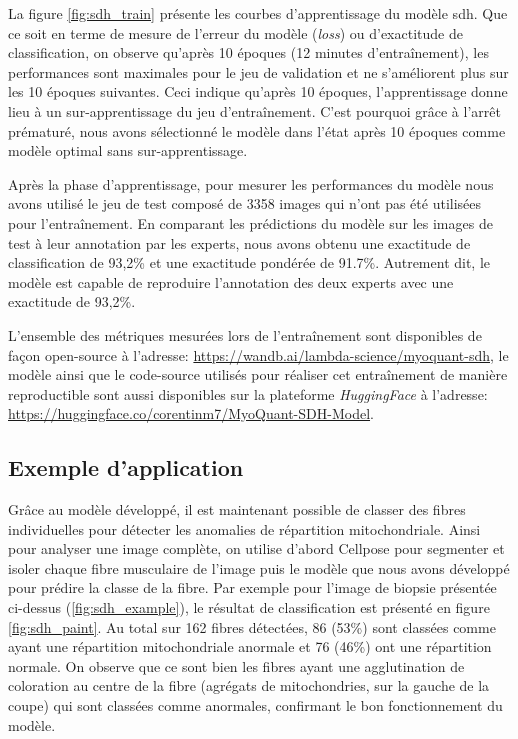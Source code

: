 La figure \ref{fig:sdh_train} présente les courbes d'apprentissage du modèle \gls{sdh}. Que ce soit en terme de mesure de l'erreur du modèle (\textit{loss}) ou d'exactitude de classification, on observe qu'après 10 époques (12 minutes d'entraînement), les performances sont maximales pour le jeu de validation et ne s'améliorent plus sur les 10 époques suivantes. Ceci indique qu'après 10 époques, l'apprentissage donne lieu à un sur-apprentissage du jeu d'entraînement. C'est pourquoi grâce à l'arrêt prématuré, nous avons sélectionné le modèle dans l'état après 10 époques comme modèle optimal sans sur-apprentissage.

Après la phase d'apprentissage, pour mesurer les performances du modèle nous avons utilisé le jeu de test composé de 3358 images qui n'ont pas été utilisées pour l'entraînement. En comparant les prédictions du modèle sur les images de test à leur annotation par les experts, nous avons obtenu une exactitude de classification de 93,2\% et une exactitude pondérée de 91.7\%. Autrement dit, le modèle est capable de reproduire l'annotation des deux experts avec une exactitude de 93,2\%.

L'ensemble des métriques mesurées lors de l'entraînement sont disponibles de façon open-source à l'adresse: \href{https://wandb.ai/lambda-science/myoquant-sdh}{https://wandb.ai/lambda-science/myoquant-sdh}, le modèle ainsi que le code-source utilisés pour réaliser cet entraînement de manière reproductible sont aussi disponibles sur la plateforme \textit{HuggingFace} à l'adresse: \href{https://huggingface.co/corentinm7/MyoQuant-SDH-Model}{https://huggingface.co/corentinm7/MyoQuant-SDH-Model}.

\subsection{Exemple d'application}
Grâce au modèle développé, il est maintenant possible de classer des fibres individuelles pour détecter les anomalies de répartition mitochondriale. Ainsi pour analyser une image complète, on utilise d'abord Cellpose pour segmenter et isoler chaque fibre musculaire de l'image puis le modèle que nous avons développé pour prédire la classe de la fibre. Par exemple pour l'image de biopsie présentée ci-dessus (\ref{fig:sdh_example}), le résultat de classification est présenté en figure \ref{fig:sdh_paint}. Au total sur 162 fibres détectées, 86 (53\%) sont classées comme ayant une répartition mitochondriale anormale et 76 (46\%) ont une répartition normale. On observe que ce sont bien les fibres ayant une agglutination de coloration au centre de la fibre (agrégats de mitochondries, sur la gauche de la coupe) qui sont classées comme anormales, confirmant le bon fonctionnement du modèle.

